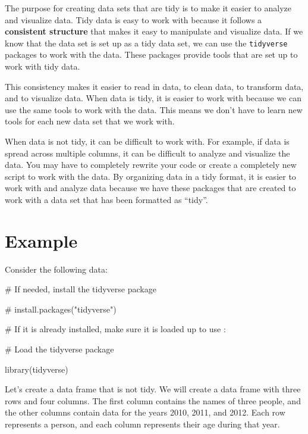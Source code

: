 \documentclass[
  letterpaper,
  DIV=11,
  numbers=noendperiod]{scrreprt}
\newenvironment{Shaded}{\begin{snugshade}}{\end{snugshade}}
\newcommand{\CommentTok}[1]{\textcolor[rgb]{0.37,0.37,0.37}{#1}}
\newcommand{\FunctionTok}[1]{\textcolor[rgb]{0.28,0.35,0.67}{#1}}
\newcommand{\NormalTok}[1]{\textcolor[rgb]{0.00,0.23,0.31}{#1}}
\begin{document}
The purpose for creating data sets that are tidy is to make it easier to
analyze and visualize data. Tidy data is easy to work with because it
follows a \textbf{consistent structure} that makes it easy to manipulate
and visualize data. If we know that the data set is set up as a tidy
data set, we can use the \texttt{tidyverse} packages to work with the
data. These packages provide tools that are set up to work with tidy
data.

This consistency makes it easier to read in data, to clean data, to
transform data, and to visualize data. When data is tidy, it is easier
to work with because we can use the same tools to work with the data.
This means we don't have to learn new tools for each new data set that
we work with.

When data is not tidy, it can be difficult to work with. For example, if
data is spread across multiple columns, it can be difficult to analyze
and visualize the data. You may have to completely rewrite your code or
create a completely new script to work with the data. By organizing data
in a tidy format, it is easier to work with and analyze data because we
have these packages that are created to work with a data set that has
been formatted as ``tidy''.

\section*{Example}\label{example}


Consider the following data:

\begin{Shaded}
\begin{Highlighting}[]
\CommentTok{\# If needed, install the tidyverse package}

\CommentTok{\# install.packages("tidyverse")}

\CommentTok{\# If it is already installed, make sure it is loaded up to use :}

\CommentTok{\# Load the tidyverse package}

\FunctionTok{library}\NormalTok{(tidyverse)}
\end{Highlighting}
\end{Shaded}

Let's create a data frame that is not tidy. We will create a data frame
with three rows and four columns. The first column contains the names of
three people, and the other columns contain data for the years 2010,
2011, and 2012. Each row represents a person, and each column represents
their age during that year.
\end{document}

